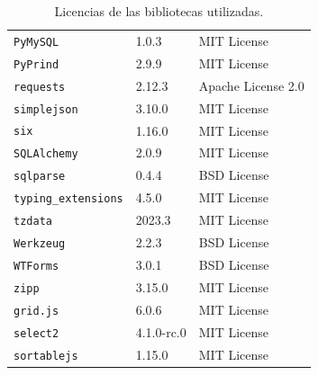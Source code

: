 \begin{table}
\begin{tabular}{|l|p{}|p{}|}
\texttt{PyMySQL} & 1.0.3 & MIT License \\
\texttt{PyPrind} & 2.9.9 & MIT License \\
\texttt{requests} & 2.12.3 & Apache License 2.0 \\
\texttt{simplejson} & 3.10.0 & MIT License \\
\texttt{six} & 1.16.0 & MIT License \\
\texttt{SQLAlchemy} & 2.0.9 & MIT License \\
\texttt{sqlparse} & 0.4.4 & BSD License \\
\texttt{typing\_extensions} & 4.5.0 & MIT License \\
\texttt{tzdata} & 2023.3 & MIT License \\
\texttt{Werkzeug} & 2.2.3 & BSD License \\
\texttt{WTForms} & 3.0.1 & BSD License \\
\texttt{zipp} & 3.15.0 & MIT License \\
\texttt{grid.js} & 6.0.6 & MIT License \\
\texttt{select2} & 4.1.0-rc.0 & MIT License \\
\texttt{sortablejs} & 1.15.0 & MIT License \\
\hline
\end{tabular}
\caption{Licencias de las bibliotecas utilizadas.}\label{table-A:licencias}
\end{table}

